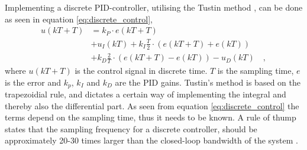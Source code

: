 \documentclass[../../main.tex]{subfiles}
\begin{document}
Implementing a discrete PID-controller, utilising the Tustin method  \cite{Tustin}, can be done as seen in equation \ref{eq:discrete_control}, 
\begin{equation}\label{eq:discrete_control}
\begin{split}
        u(kT+T) &= k_P\cdot e(kT+T)\\&+u_I(kT) + k_I\frac{T}{2} \cdot (e(kT+T)+e(kT))\\ &+k_D \frac{2}{T}\cdot(e(kT+T)-e(kT))-u_D(kT) \quad ,
\end{split}
\end{equation}
where $u(kT+T)$ is the control signal in discrete time. $T$ is the sampling time, $e$ is the error and $k_p$, $k_I$ and $k_D$ are the PID gains. Tustin's method is based on the trapezoidial rule, and dictates a certain way of implementing the integral and thereby also the differential part. As seen from equation \ref{eq:discrete_control} the terms depend on the sampling time, thus it needs to be known. A rule of thump states that the sampling frequency for a discrete controller, should be approximately 20-30 times larger than the closed-loop bandwidth of the system \cite{Design_Of_Digital_Control_Systems_NOTE}. 
\end{document}
